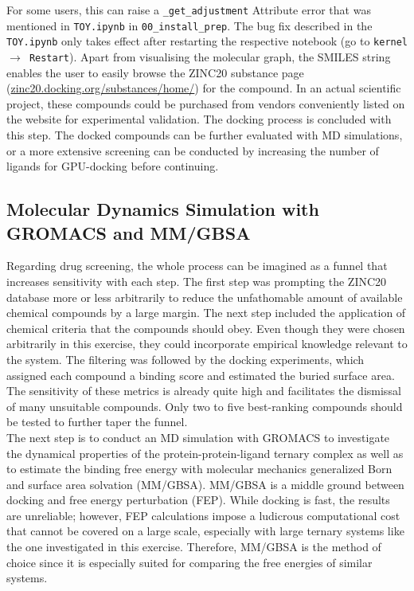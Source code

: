 \documentclass[9pt,tutorial]{livecoms}
\newcommand{\code}[1]{\colorbox{light-gray}{\texttt{#1}}}
\begin{document}
For some users, this can raise a \code{\_get\_adjustment} Attribute error that was mentioned in \code{TOY.ipynb} in \code{00\_install\_prep}. The bug fix described in the \code{TOY.ipynb} only takes effect after restarting the respective notebook (go to \code{kernel $\to$ Restart}). Apart from visualising the molecular graph, the SMILES string enables the user to easily browse the ZINC20 substance page (\url{zinc20.docking.org/substances/home/}) for the compound. In an actual scientific project, these compounds could be purchased from vendors conveniently listed on the website for experimental validation. The docking process is concluded with this step. The docked compounds can be further evaluated with MD simulations, or a more extensive screening can be conducted by increasing the number of ligands for GPU-docking before continuing.


\subsection*{Molecular Dynamics Simulation with GROMACS and MM/GBSA}
Regarding drug screening, the whole process can be imagined as a funnel that increases sensitivity with each step. The first step was prompting the ZINC20 database more or less arbitrarily to reduce the unfathomable amount of available chemical compounds by a large margin. The next step included the application of chemical criteria that the compounds should obey. Even though they were chosen arbitrarily in this exercise, they could incorporate empirical knowledge relevant to the system. The filtering was followed by the docking experiments, which assigned each compound a binding score and estimated the buried surface area. The sensitivity of these metrics is already quite high and facilitates the dismissal of many unsuitable compounds. Only two to five best-ranking compounds should be tested to further taper the funnel.\\
The next step is to conduct an MD simulation with GROMACS\cite{mark_abraham_2023_8134388} to investigate the dynamical properties of the protein-protein-ligand ternary complex as well as to estimate the binding free energy with  molecular mechanics generalized Born and surface area solvation (MM/GBSA).\cite{Wang2019} MM/GBSA is a middle ground between docking and free energy perturbation (FEP). While docking is fast, the results are unreliable; however, FEP calculations impose a ludicrous computational cost that cannot be covered on a large scale, especially with large ternary systems like the one investigated in this exercise. Therefore, MM/GBSA is the method of choice since it is especially suited for comparing the free energies of similar systems.
\end{document}
